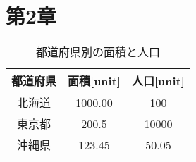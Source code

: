 \section{第2章}
\label{sec:2}
\lipsum[3]

\newpage
\begin{table}[b]
    \centering
    \caption{都道府県別の面積と人口}
    \label{tab:todofuken}
    \begin{tabular}{@{}cSS@{}}
    \toprule
    都道府県 & 面積{[}unit{]} & 人口{[}unit{]} \\ \midrule
    北海道  & 1000.00      & 100          \\
    東京都  & 200.5        & 10000        \\
    沖縄県  & 123.45       & 50.05        \\ \bottomrule
    \end{tabular}
\end{table}
